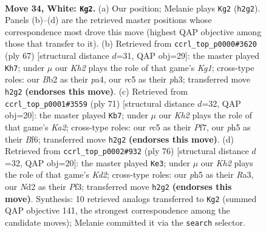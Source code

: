\documentclass[11pt]{article}
\begin{document}
\clearpage

\begin{figure}[p]\centering
\begin{subfigure}{0.46\textwidth}\centering
\resizebox{\linewidth}{!}{%
\newchessgame
\chessboard[
  setfen={5k2/1R6/2p3p1/2r2p1p/r6P/P5P1/1B1N3K/8 w - - 0 34},
  showmover=false,
  pgfstyle=straightmove, color=movearrow, markmove={h2-g2}
]}
\caption{}
\end{subfigure}\hfill
\begin{subfigure}{0.46\textwidth}\centering
\resizebox{\linewidth}{!}{%
\newchessgame
\chessboard[
  setfen={6k1/6p1/5p2/pR3P1P/P7/7P/1Pr2pK1/8 b - - 0 34},
  showmover=false,
  pgfstyle=straightmove, color=movearrow, markmove={g8-h7}
]}
\caption{}
\end{subfigure}
\\[4pt]
\begin{subfigure}{0.46\textwidth}\centering
\resizebox{\linewidth}{!}{%
\newchessgame
\chessboard[
  setfen={8/k4pp1/1p1p1b2/1R3P1B/8/P7/KPP5/4r3 b - - 1 36},
  showmover=false,
  pgfstyle=straightmove, color=movearrow, markmove={a7-b7}
]}
\caption{}
\end{subfigure}\hfill
\begin{subfigure}{0.46\textwidth}\centering
\resizebox{\linewidth}{!}{%
\newchessgame
\chessboard[
  setfen={8/7p/2p1kpp1/p6r/2P4P/R4PP1/P2K4/8 w - - 1 39},
  showmover=false,
  pgfstyle=straightmove, color=movearrow, markmove={d2-e3}
]}
\caption{}
\end{subfigure}
\caption{\textbf{Move 34, White: \texttt{Kg2}.} (a) Our position; Melanie plays \texttt{Kg2} (\texttt{h2g2}). Panels (b)--(d) are the retrieved master positions whose correspondence most drove this move (highest QAP objective among those that transfer to it). (b) Retrieved from \texttt{ccrl\_top\_p0000\#3620} (ply 67) [structural distance $d$=31, QAP obj=29]: the master played \texttt{Kh7}; under $\mu$ our \emph{Kh2} plays the role of that game's \emph{Kg1}; cross-type roles: our \emph{B}b2 as their \emph{p}a4, our \emph{r}c5 as their \emph{p}h3; transferred move \texttt{h2g2} \textbf{(endorses this move)}. (c) Retrieved from \texttt{ccrl\_top\_p0001\#3559} (ply 71) [structural distance $d$=32, QAP obj=20]: the master played \texttt{Kb7}; under $\mu$ our \emph{Kh2} plays the role of that game's \emph{Ka2}; cross-type roles: our \emph{r}c5 as their \emph{P}f7, our \emph{p}h5 as their \emph{B}f6; transferred move \texttt{h2g2} \textbf{(endorses this move)}. (d) Retrieved from \texttt{ccrl\_top\_p0002\#932} (ply 76) [structural distance $d$=32, QAP obj=20]: the master played \texttt{Ke3}; under $\mu$ our \emph{Kh2} plays the role of that game's \emph{Kd2}; cross-type roles: our \emph{p}h5 as their \emph{R}a3, our \emph{N}d2 as their \emph{P}f3; transferred move \texttt{h2g2} \textbf{(endorses this move)}. Synthesis: 10 retrieved analogs transferred to \texttt{Kg2} (summed QAP objective 141, the strongest correspondence among the candidate moves); Melanie committed it via the \texttt{search} selector.}
\label{fig:thought-m66}
\end{figure}
\end{document}
